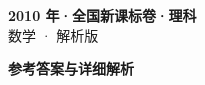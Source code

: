 \documentclass[zihao=-4, a4paper]{ctexart}
\begin{document}
\begin{center}
  {\Large\bfseries 2010 年·全国新课标卷·理科}\\[4pt]
  {\large 数学 · 解析版}
\end{center}
\medskip
{}

\clearpage
{}
\begin{center}{\Large\bfseries 参考答案与详细解析}\end{center}
\medskip

\end{document}
